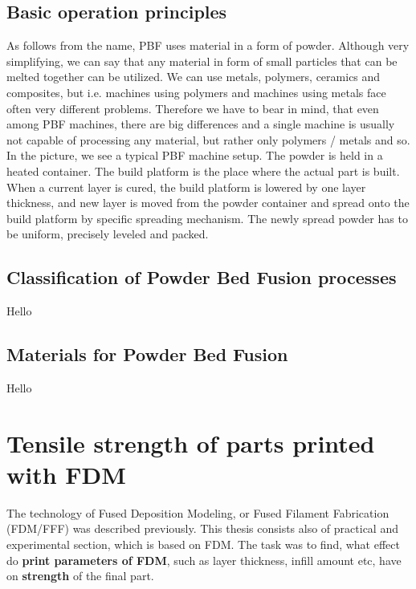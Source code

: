 \documentclass[a4paper, twoside, 11pt]{report}
\begin{document}
\section{Basic operation principles}
As follows from the name, PBF uses material in a form of powder. Although very simplifying, we can say that any material in form of small particles that can be melted together can be utilized. We can use metals, polymers, ceramics and composites, but i.e. machines using polymers and machines using metals face often very different problems. Therefore we have to bear in mind, that even among PBF machines, there are big differences and a single machine is usually not capable of processing any material, but rather only polymers / metals and so.
\\
In the picture, we see a typical PBF machine setup. The powder is held in a heated container. The build platform is the place where the actual part is built. When a current layer is cured, the build platform is lowered by one layer thickness, and new layer is moved from the powder container and spread onto the build platform by specific spreading mechanism. The newly spread powder has to be uniform, precisely leveled and packed.

\section{Classification of Powder Bed Fusion processes}
Hello
\section{Materials for Powder Bed Fusion}
Hello


\chapter{Tensile strength of parts printed with FDM}
The technology of Fused Deposition Modeling, or Fused Filament Fabrication (FDM/FFF) was described previously. This thesis consists also of practical and experimental section, which is based on FDM. The task was to find, what effect do \textbf{print parameters of FDM}, such as layer thickness, infill amount etc, have on \textbf{strength} of the final part.\\
\end{document}
